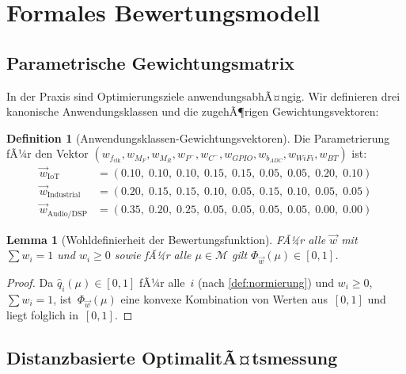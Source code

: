﻿\documentclass[12pt, a4paper]{article}
\theoremstyle{plain}
\newtheorem{lemma}[theorem]{Lemma}
\theoremstyle{definition}
\newtheorem{definition}[theorem]{Definition}
\theoremstyle{remark}
\begin{document}
\section{Formales Bewertungsmodell}
\label{sec:bewertungsmodell}

\subsection{Parametrische Gewichtungsmatrix}

In der Praxis sind Optimierungsziele anwendungsabhÃ¤ngig.
Wir definieren drei kanonische Anwendungsklassen und die zugehÃ¶rigen
Gewichtungsvektoren:

\begin{definition}[Anwendungsklassen-Gewichtungsvektoren]
\label{def:anwendungsklassen}
  Die Parametrierung fÃ¼r den Vektor
  $(w_{f_\text{clk}}, w_{M_F}, w_{M_R}, w_{P^-}, w_{C^-},
    w_{GPIO}, w_{b_{ADC}}, w_{WiFi}, w_{BT})$ ist:
  \begin{align*}
    \vec{w}_\text{IoT}       &= (0.10,\; 0.10,\; 0.10,\; 0.15,\; 0.15,\; 0.05,\; 0.05,\; 0.20,\; 0.10) \\
    \vec{w}_\text{Industrial} &= (0.20,\; 0.15,\; 0.15,\; 0.10,\; 0.05,\; 0.15,\; 0.10,\; 0.05,\; 0.05) \\
    \vec{w}_\text{Audio/DSP}  &= (0.35,\; 0.20,\; 0.25,\; 0.05,\; 0.05,\; 0.05,\; 0.05,\; 0.00,\; 0.00)
  \end{align*}
\end{definition}

\begin{lemma}[Wohldefinierheit der Bewertungsfunktion]
\label{lem:wohldef}
  FÃ¼r alle $\vec{w}$ mit $\sum w_i = 1$ und $w_i \ge 0$ sowie fÃ¼r alle
  $\mu \in \mathcal{M}$ gilt $\Phi_{\vec{w}}(\mu) \in [0,1]$.
\end{lemma}

\begin{proof}
  Da $\hat{q}_i(\mu) \in [0,1]$ fÃ¼r alle~$i$ (nach \cref{def:normierung})
  und $w_i \ge 0$, $\sum w_i = 1$, ist~$\Phi_{\vec{w}}(\mu)$ eine konvexe
  Kombination von Werten aus~$[0,1]$ und liegt folglich in~$[0,1]$.
 
\end{proof}

\subsection{Distanzbasierte OptimalitÃ¤tsmessung}
\end{document}
